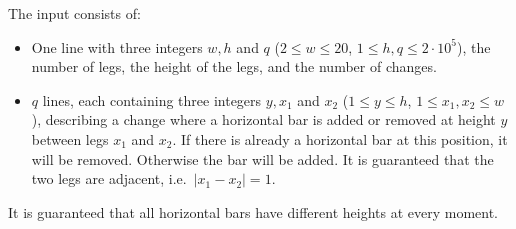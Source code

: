 
	The input consists of:
	\begin{itemize}
		\item One line with three integers $w, h$ and $q$ ($2 \leq w \leq 20$, $1\leq h,q \leq 2\cdot10^5$), the number of legs, the height of the legs, and the number of changes.
		\item $q$ lines, each containing three integers $y, x_{1}$ and $x_{2}$ ($1\leq y \leq h$, $1\leq x_{1}, x_{2} \leq w$), describing a change where a horizontal bar is added or removed at height $y$ between legs $x_1$ and $x_2$.
								If there is already a horizontal bar at this position, it will be removed. Otherwise the bar will be added.
		It is guaranteed that the two legs are adjacent, i.e.\ $|x_{1}-x_{2}|=1$.
	\end{itemize}	
	It is guaranteed that all horizontal bars have different heights at every moment.
